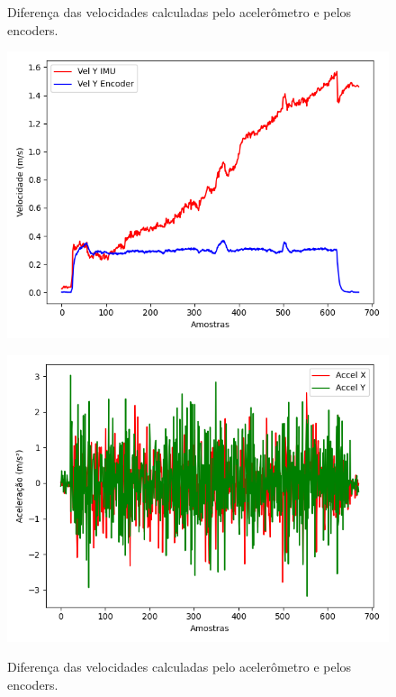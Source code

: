 \documentclass[acronym, symbols, table]{fei}
\begin{document}
			\begin{figure}
				\centering
				\begin{minipage}[t]{0.47\textwidth}
					\centering
					\caption{Diferença das velocidades calculadas pelo acelerômetro e pelos encoders.}
					\includegraphics[width=\textwidth]{comparacao_velocidade_accel_encoder.png}
					\label{fig:comparacao_velocidade_accel_encoder}
				\end{minipage}
				\hspace{1em}
				\begin{minipage}[t]{0.47\textwidth}
					\centering
					\caption{Diferença das velocidades calculadas pelo acelerômetro e pelos encoders.}
					\includegraphics[width=\textwidth]{dados_acelerometro_x_y.png}
					\label{fig:comparacao_acelerometro_x_y}
				\end{minipage}
			\end{figure}
			
\end{document}
